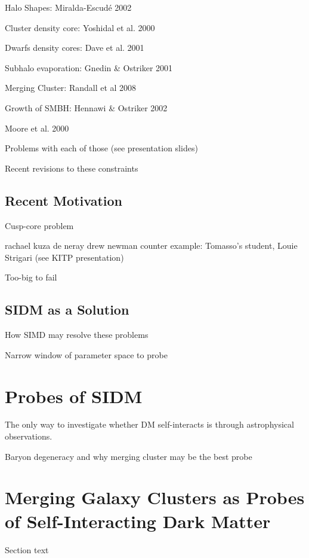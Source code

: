 Halo Shapes: Miralda-Escudé 2002

Cluster density core: Yoshidal et al. 2000

Dwarfs density cores: Dave et al. 2001

Subhalo evaporation: Gnedin \& Ostriker 2001

Merging Cluster: Randall et al 2008

Growth of SMBH: Hennawi \& Ostriker 2002

Moore et al. 2000 \citep{Moore:2000ee}

Problems with each of those (see presentation slides)

Recent revisions to these constraints \citep{Peter:2012vi}

\subsection{Recent Motivation}

Cusp-core problem

	rachael kuza de neray
	drew newman
	counter example: Tomasso's student, Louie Strigari (see KITP presentation)

Too-big to fail

\subsection{SIDM as a Solution}

How SIMD may resolve these problems

Narrow window of parameter space to probe \citep{Rocha:2012tr}

\section{Probes of SIDM}

The only way to investigate whether DM self-interacts is through astrophysical observations.

Baryon degeneracy and why merging cluster may be the best probe

\section{Merging Galaxy Clusters as Probes of Self-Interacting Dark Matter}

Section text

